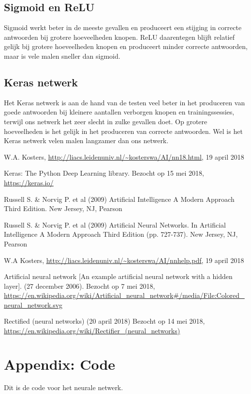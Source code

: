 \documentclass[10pt]{article}
\begin{document}
\subsection{Sigmoid en ReLU}
Sigmoid werkt beter in de meeste gevallen en produceert een stijging in correcte antwoorden bij grotere hoeveelheden knopen. ReLU daarentegen blijft relatief gelijk bij grotere hoeveelheden knopen en produceert minder correcte antwoorden, maar is vele malen sneller dan sigmoid.

\subsection{Keras netwerk}
Het Keras netwerk is aan de hand van de testen veel beter in het produceren van goede antwoorden bij kleinere aantallen verborgen knopen en trainingssessies, terwijl ons netwerk het zeer slecht in zulke gevallen doet. Op grotere hoeveelheden is het gelijk in het produceren van correcte antwoorden. Wel is het Keras netwerk velen malen langzamer dan ons netwerk.

\clearpage

\begin{thebibliography}{XX}

W.A. Kosters, \href{http://liacs.leidenuniv.nl/~kosterswa/AI/nn18.html}{\underline{http://liacs.leidenuniv.nl/\textasciitilde{}kosterswa/AI/nn18.html}}, 19 april 2018

Keras: The Python Deep Learning library. Bezocht op 15 mei 2018, \href{https://keras.io/}{\underline{https://keras.io/}}

Russell S. \& Norvig P. et al (2009) Artificial Intelligence A Modern Approach Third Edition. New Jersey, NJ, Pearson

Russell S. \& Norvig P. et al (2009) Artificial Neural Networks. In Artificial Intelligence A Modern Approach Third Edition (pp. 727-737). New Jersey, NJ, Pearson

W.A Kosters, \href{http://liacs.leidenuniv.nl/\textasciitilde{}kosterswa/AI/nnhelp.pdf}{\underline{http://liacs.leidenuniv.nl/\textasciitilde{}kosterswa/AI/nnhelp.pdf}}, 19 april 2018

Artificial neural network [An example artificial neural network with a hidden layer]. (27 december 2006).
Bezocht op 7 mei 2018, 
\href{https://en.wikipedia.org/wiki/Artificial_neural_network#/media/File:Colored_neural_network.svg}{\underline{https://en.wikipedia.org/wiki/Artificial\_neural\_network\#/media/File:Colored\_neural\_network.svg}}

 Rectified (neural networks) (20 april 2018) Bezocht op 14 mei 2018, \href{https://en.wikipedia.org/wiki/Rectifier_(neural_networks)}{\underline{https://en.wikipedia.org/wiki/Rectifier\_(neural\_networks)}}


\end{thebibliography}

\clearpage

\section*{Appendix: Code}
Dit is de code voor het neurale netwerk.

\end{document}
